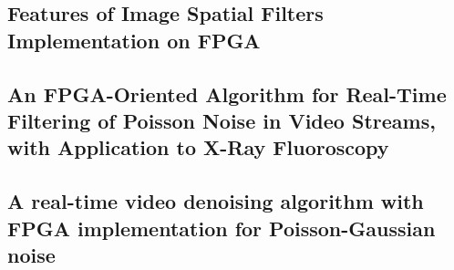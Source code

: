 \subsection{Features of Image Spatial Filters Implementation on FPGA}
\blindtext {}

\subsection{An FPGA-Oriented Algorithm for Real-Time Filtering of Poisson Noise in Video Streams, with Application to X-Ray Fluoroscopy}
\blindtext {}

\subsection{A real-time video denoising algorithm with FPGA implementation for Poisson-Gaussian noise}
\blindtext {}
